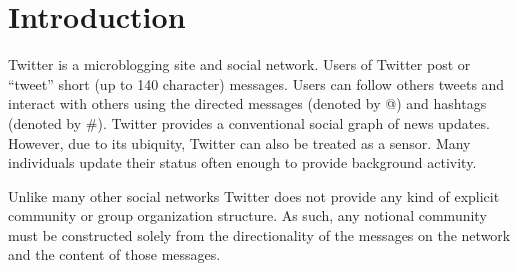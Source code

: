 \section{Introduction}
Twitter is a microblogging site and social network.  Users of Twitter post or ``tweet'' short (up to 140 character) messages.  Users can follow others tweets and interact with others using the directed messages (denoted by @) and hashtags (denoted by \#). Twitter provides a conventional social graph of news updates.  However, due to its ubiquity, Twitter can also be treated as a sensor.  Many individuals update their status often enough to provide background activity.

Unlike many other social networks Twitter does not provide any kind of explicit community or group organization structure.  As such, any notional community must be constructed solely from the directionality of the messages on the network and the content of those messages.